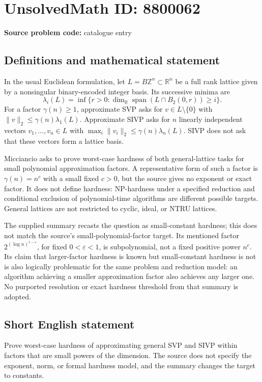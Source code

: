 \documentclass[11pt]{article}
\newcommand{\Z}{\mathbb{Z}}
\newcommand{\R}{\mathbb{R}}
\begin{document}
\section*{UnsolvedMath ID: 8800062}
\textbf{Source problem code:} catalogue entry
\subsection{Definitions and mathematical statement}
In the usual Euclidean formulation, let \(L=B\Z^n\subset\R^n\) be a full rank lattice given by a nonsingular binary-encoded integer basis. Its successive minima are
\[
 \lambda_i(L)=\inf\{r>0:\dim_\R\operatorname{span}(L\cap B_2(0,r))\geq i\}.
\]
For a factor \(\gamma(n)\geq1\), approximate SVP asks for \(v\in L\setminus\{0\}\) with \(\|v\|_2\leq\gamma(n)\lambda_1(L)\). Approximate SIVP asks for \(n\) linearly independent vectors \(v_1,\ldots,v_n\in L\) with \(\max_i\|v_i\|_2\leq\gamma(n)\lambda_n(L)\). SIVP does not ask that these vectors form a lattice basis.

Micciancio asks to prove worst-case hardness of both general-lattice tasks for small polynomial approximation factors. A representative form of such a factor is \(\gamma(n)=n^c\) with a small fixed \(c>0\), but the source gives no exponent or exact factor. It does not define hardness: NP-hardness under a specified reduction and conditional exclusion of polynomial-time algorithms are different possible targets. General lattices are not restricted to cyclic, ideal, or NTRU lattices.

The supplied summary recasts the question as small-constant hardness; this does not match the source's small-polynomial-factor target. Its mentioned factor \(2^{(\log n)^{1-\varepsilon}}\), for fixed \(0<\varepsilon<1\), is subpolynomial, not a fixed positive power \(n^c\). Its claim that larger-factor hardness is known but small-constant hardness is not is also logically problematic for the same problem and reduction model: an algorithm achieving a smaller approximation factor also achieves any larger one. No purported resolution or exact hardness threshold from that summary is adopted.
\subsection{Short English statement}
Prove worst-case hardness of approximating general SVP and SIVP within factors that are small powers of the dimension. The source does not specify the exponent, norm, or formal hardness model, and the summary changes the target to constants.
\end{document}
